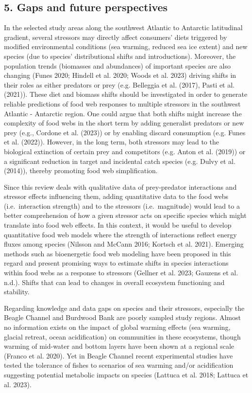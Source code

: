 \documentclass[
]{article}
\begin{document}
\normalsize

\subsection{5. Gaps and future
perspectives}\label{gaps-and-future-perspectives}

In the selected study areas along the southwest Atlantic to Antarctic
latitudinal gradient, several stressors may directly affect consumers'
diets triggered by modified environmental conditions (sea warming,
reduced sea ice extent) and new species (due to species' distributional
shifts and introductions). Moreover, the population trends (biomasses
and abundances) of important species are also changing (Funes 2020;
Hindell et al. 2020; Woods et al. 2023) driving shifts in their roles as
either predators or prey (e.g. Belleggia et al. (2017), Pasti et al.
(2021)). These diet and biomass shifts should be investigated in order
to generate reliable predictions of food web responses to multiple
stressors in the southwest Atlantic - Antarctic region. One could argue
that both shifts might increase the complexity of food webs in the short
term by adding generalist predators or new prey (e.g., Cordone et al.
(2023)) or by enabling discard consumption (e.g. Funes et al. (2022)).
However, in the long term, both stressors may lead to the biological
extinction of certain prey and competitors (e.g. Anton et al. (2019)) or
a significant reduction in target and incidental catch species (e.g.
Dulvy et al. (2014)), thereby promoting food web simplification.

Since this review deals with qualitative data of prey-predator
interactions and stressor effects influencing them, adding quantitative
data to the food webs (i.e.~interaction strength) and to the stressors
(i.e.~magnitude) would lead to a better comprehension of how a given
stressor acts on specific species which might translate into food web
effects. In this context, it would be useful to develop quantitative
food web models where the strength of interactions reflect energy fluxes
among species (Nilsson and McCann 2016; Kortsch et al. 2021). Emerging
methods such as bioenergetic food web modeling have been proposed in
this regard and present promising ways to estimate shifts in species
interactions within food webs as a response to stressors (Gellner et al.
2023; Gauzens et al. n.d.). Shifts that can lead to changes in overall
ecosystem functioning and stability.

Regarding knowledge and data gaps on species and their stressors,
especially the Beagle Channel and Burdwood Bank are poorly sampled study
regions. Almost no information exists on the impact of global warming
effects (sea warming, glacial retreat, ocean acidification) on
communities in these ecosystems, though warming of mid-water and bottom
layers have been shown at a regional scale (Franco et al. 2020). Yet in
Beagle Channel recent experimental studies have tested the tolerance of
fishes to scenarios of sea warming and/or acidification suggesting
potential metabolic impacts on species (Lattuca et al. 2018; Lattuca et
al. 2023).
\end{document}
